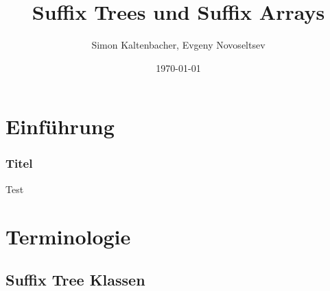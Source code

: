\documentclass{beamer}
\title{Suffix Trees und Suffix Arrays}
\author{Simon Kaltenbacher, Evgeny Novoseltsev}
\date{\today}
\begin{document}

\frame{\titlepage}




\section{Einführung}
\begin{frame}
\frametitle{Titel}
Test
\end{frame}


\section{Terminologie}


\subsection{Suffix Tree Klassen}
\end{document}
